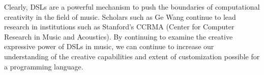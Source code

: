 \documentclass{report}
\begin{document}
Clearly, DSLs are a powerful mechanism to push the boundaries of  computational creativity in the field of music. Scholars such as  Ge Wang continue to lead  research in institutions such as Stanford's CCRMA (Center for Computer Research in Music and Acoustics). By continuing to examine the creative expressive power of DSLs  in  music, we can continue to increase our understanding of the creative capabilities and extent of customization possible for  a programming language.



\end{document}
